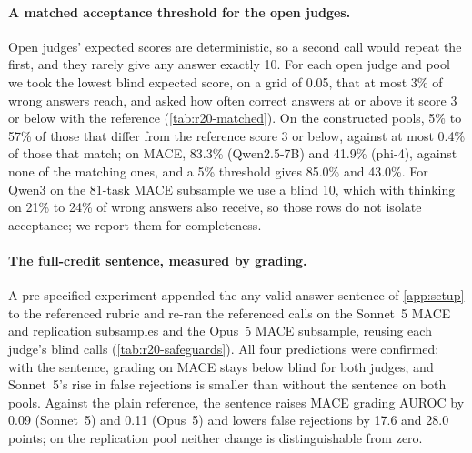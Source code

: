 \paragraph{A matched acceptance threshold for the open judges.}
Open judges' expected scores are deterministic, so a second call would repeat the first, and they rarely give any answer exactly 10. For each open judge and pool we took the lowest blind expected score, on a grid of 0.05, that at most 3\% of wrong answers reach, and asked how often correct answers at or above it score 3 or below with the reference (\cref{tab:r20-matched}). On the constructed pools, 5\% to 57\% of those that differ from the reference score 3 or below, against at most 0.4\% of those that match; on \textsc{MACE}, 83.3\% (Qwen2.5-7B) and 41.9\% (phi-4), against none of the matching ones, and a 5\% threshold gives 85.0\% and 43.0\%.\ph{} For Qwen3 on the 81-task \textsc{MACE} subsample we use a blind 10, which with thinking on 21\% to 24\% of wrong answers also receive, so those rows do not isolate acceptance; we report them for completeness.

\begin{table}[htbp]
\centering
\caption{Acceptance at a matched threshold for the open judges (full 64-candidate pools; any-format labels on the constructed pools, answer lists on \textsc{MACE}; exact scorer for Qwen2.5 and gemma-2), and at a blind 10 for Qwen3 on the \textsc{MACE} subsample. Threshold: the lowest blind expected score that at most 3\% of wrong answers reach.\ph}
\label{tab:r20-matched}
\footnotesize
\setlength{\tabcolsep}{2.6pt}

\end{table}

\paragraph{The full-credit sentence, measured by grading.}
A pre-specified experiment appended the any-valid-answer sentence of \cref{app:setup} to the referenced rubric and re-ran the referenced calls on the Sonnet~5 \textsc{MACE} and replication subsamples and the Opus~5 \textsc{MACE} subsample, reusing each judge's blind calls (\cref{tab:r20-safeguards}). All four predictions were confirmed: with the sentence, grading on \textsc{MACE} stays below blind for both judges, and Sonnet~5's rise in false rejections is smaller than without the sentence on both pools. Against the plain reference, the sentence raises \textsc{MACE} grading AUROC by 0.09 (Sonnet~5) and 0.11 (Opus~5) and lowers false rejections by 17.6 and 28.0 points; on the replication pool neither change is distinguishable from zero.\ph{}

